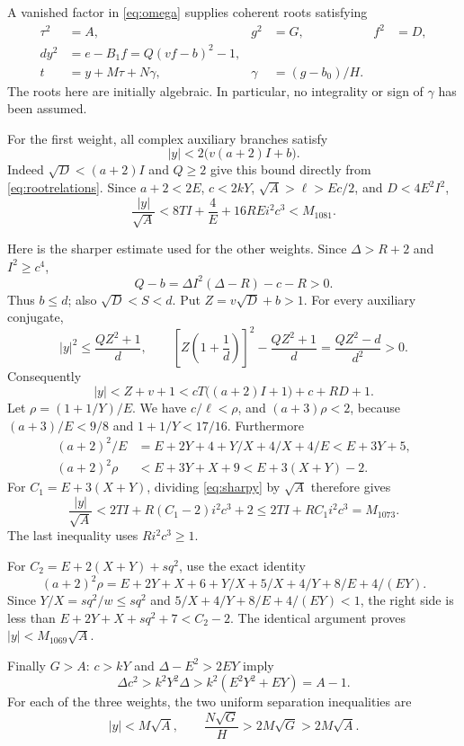 \documentclass[11pt,letterpaper]{article}
\theoremstyle{remark}
\begin{document}
A vanished factor in \eqref{eq:omega} supplies coherent roots satisfying
\begin{align}
 \tau^2&=A,&g^2&=G,&f^2&=D,\nonumber\\
 d y^2&=e-B_1f=Q(vf-b)^2-1,\label{eq:rootrelations}\\
 t&=y+M\tau+N\gamma,&\gamma&=(g-b_0)/H.
 \label{eq:linearroot}
\end{align}
The roots here are initially algebraic. In particular, no integrality
or sign of $\gamma$ has been assumed.

For the first weight, all complex auxiliary branches satisfy
\[
 |y|<2\bigl(v(a+2)I+b\bigr).
\]
Indeed $\sqrt D<(a+2)I$ and $Q\ge2$ give this bound directly from
\eqref{eq:rootrelations}. Since
$a+2<2E$, $c<2kY$, $\sqrt A>\ell>Ec/2$, and $D<4E^2I^2$,
\[
 \frac{|y|}{\sqrt A}
 <8TI+\frac4E+16REi^2c^3<M_{1081}.
\]

Here is the sharper estimate used for the other weights.
Since $\Delta>R+2$ and $I^2\ge c^4$,
\[
 Q-b=\Delta I^2(\Delta-R)-c-R>0.
\]
Thus $b\le d$; also $\sqrt D<S<d$.
Put $Z=v\sqrt D+b>1$. For every auxiliary conjugate,
\[
 |y|^2\le\frac{QZ^2+1}{d},\qquad
 \left[Z\left(1+\frac1d\right)\right]^2-
       \frac{QZ^2+1}{d}=\frac{QZ^2-d}{d^2}>0.
\]
Consequently
\begin{equation}
 |y|<Z+v+1<cT\bigl((a+2)I+1\bigr)+c+RD+1.
 \label{eq:sharpy}
\end{equation}
Let $\rho=(1+1/Y)/E$. We have $c/\ell<\rho$, and
$(a+3)\rho<2$, because
$(a+3)/E<9/8$ and $1+1/Y<17/16$.
Furthermore
\begin{align*}
 (a+2)^2/E&=E+2Y+4+Y/X+4/X+4/E<E+3Y+5,\\
 (a+2)^2\rho&<E+3Y+X+9<E+3(X+Y)-2.
\end{align*}
For $C_1=E+3(X+Y)$, dividing \eqref{eq:sharpy} by $\sqrt A$
therefore gives
\[
 \frac{|y|}{\sqrt A}
 <2TI+R(C_1-2)i^2c^3+2
 \le 2TI+RC_1i^2c^3=M_{1073}.
\]
The last inequality uses $Ri^2c^3\ge1$.

For $C_2=E+2(X+Y)+sq^2$, use the exact identity
\[
 (a+2)^2\rho=E+2Y+X+6+Y/X+5/X+4/Y+8/E+4/(EY).
\]
Since $Y/X=sq^2/w\le sq^2$ and
$5/X+4/Y+8/E+4/(EY)<1$, the right side is less than
$E+2Y+X+sq^2+7<C_2-2$. The identical argument proves
$|y|<M_{1069}\sqrt A$.

Finally $G>A$: $c>kY$ and $\Delta-E^2>2EY$ imply
\[
 \Delta c^2>k^2Y^2\Delta>
 k^2(E^2Y^2+EY)=A-1.
\]
For each of the three weights, the two uniform separation inequalities are
\begin{equation}
 |y|<M\sqrt A,\qquad
 \frac{N\sqrt G}{H}>2M\sqrt G>2M\sqrt A.
 \label{eq:separate}
\end{equation}
\end{document}
